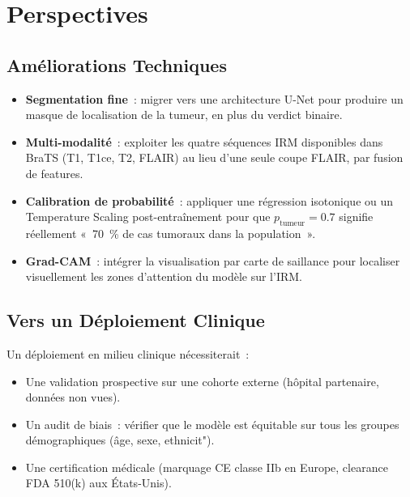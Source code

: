 \documentclass[12pt, a4paper]{report}
\begin{document}
\section{Perspectives}

\subsection{Améliorations Techniques}

\begin{itemize}
  \item \textbf{Segmentation fine}~: migrer vers une architecture
        U-Net pour produire un masque de localisation de la tumeur,
        en plus du verdict binaire.

  \item \textbf{Multi-modalité}~: exploiter les quatre séquences IRM
        disponibles dans BraTS (T1, T1ce, T2, FLAIR) au lieu d'une
        seule coupe FLAIR, par fusion de features.

  \item \textbf{Calibration de probabilité}~: appliquer une régression
        isotonique ou un Temperature Scaling post-entraînement pour
        que \(p_{\text{tumeur}} = 0.7\) signifie réellement
        «~70~\% de cas tumoraux dans la population~».

  \item \textbf{Grad-CAM}~: intégrer la visualisation par carte de
        saillance pour localiser visuellement les zones d'attention
        du modèle sur l'IRM.
\end{itemize}

\subsection{Vers un Déploiement Clinique}

Un déploiement en milieu clinique nécessiterait~:
\begin{itemize}
  \item Une validation prospective sur une cohorte externe (hôpital
        partenaire, données non vues).
  \item Un audit de biais~: vérifier que le modèle est équitable sur
        tous les groupes démographiques (âge, sexe, ethnicit").
  \item Une certification médicale (marquage CE classe IIb en Europe,
        clearance FDA 510(k) aux États-Unis).
\end{itemize}

\vspace{1cm}
\end{document}
